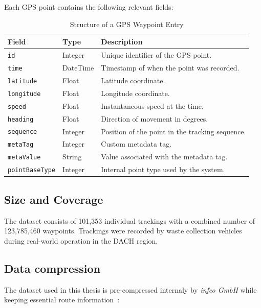 \documentclass[a4paper,12pt,twoside]{scrreprt}
\begin{document}
Each GPS point contains the following relevant fields:
\begin{table}[H]
  \centering
  \begin{tabular}{|l|l|p{8cm}|}
    \hline
    \textbf{Field}         & \textbf{Type} & \textbf{Description}
    \\
    \hline
    \texttt{id}            & Integer       & Unique identifier of the GPS
    point.
    \\
    \hline
    \texttt{time}          & DateTime      & Timestamp of when the point was
    recorded.
    \\
    \hline
    \texttt{latitude}      & Float         & Latitude coordinate.
    \\
    \hline
    \texttt{longitude}     & Float         & Longitude coordinate.
    \\
    \hline
    \texttt{speed}         & Float         & Instantaneous speed at the time.
    \\
    \hline
    \texttt{heading}       & Float         & Direction of movement in degrees.
    \\
    \hline
    \texttt{sequence}      & Integer       & Position of the point in the
    tracking
    sequence.
    \\
    \hline
    \texttt{metaTag}       & Integer       & Custom metadata tag.
    \\
    \hline
    \texttt{metaValue}     & String        & Value associated with the metadata
    tag.
    \\
    \hline
    \texttt{pointBaseType} & Integer       & Internal point type used by the
    system.
    \\
    \hline
  \end{tabular}
  \caption{Structure of a GPS Waypoint Entry}
  \label{tab:gps_point_structure}
\end{table}

\subsection{Size and Coverage}

The dataset consists of 101,353 individual trackings with a combined number of
123,785,460 waypoints.
Trackings were recorded by waste collection vehicles during real-world
operation in the DACH
region.

\subsection{Data compression}
The dataset used in this thesis is pre-compressed internaly by \textit{infeo
  GmbH} while keeping essential route information~\cite{noauthor_route_nodate}:
\end{document}
